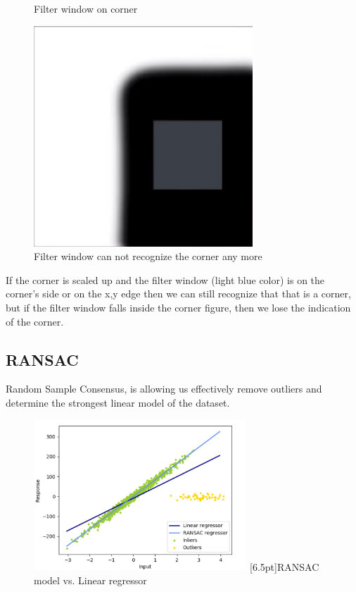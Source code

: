 \documentclass[12pt,a4paper]{report}
\begin{document}
\begin{figure}[!htb]
  \caption{Filter window on corner}\label{fig:awesome_image2}
\endminipage\hfill
{}%
  \includegraphics[width=\linewidth]{harris_in}
  \caption{Filter window can not recognize the corner any more}\label{fig:awesome_image3}
\endminipage
\end{figure}
If the corner is scaled up and the filter window (light blue color) is on the corner’s side or on the x,y edge then we can still recognize that that is a corner, but if the filter window falls inside the corner figure, then we lose the indication of the corner.

\subsection*{RANSAC}
Random Sample Consensus, is allowing us effectively remove outliers and determine the strongest linear model of the dataset.

\begin{figure}[h]
\centering
\includegraphics[width=8cm]{RANSAC}
[6.5pt]{RANSAC model vs. Linear regressor }
\end{figure}
\end{document}
